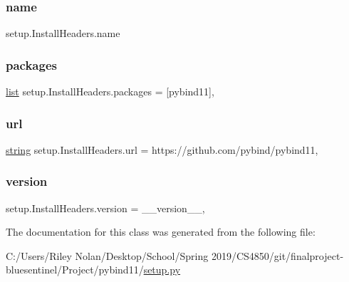 \subsubsection{\texorpdfstring{name}{name}}
{\footnotesize\ttfamily setup.\+Install\+Headers.\+name\hspace{0.3cm}{\ttfamily [static]}}

\mbox{\label{classsetup_1_1_install_headers_a4230d6d94fdf5948f36db48c501bd996}} 
\subsubsection{\texorpdfstring{packages}{packages}}
{\footnotesize\ttfamily \mbox{\hyperlink{classlist}{list}} setup.\+Install\+Headers.\+packages = \mbox{[}\textquotesingle{}pybind11\textquotesingle{}\mbox{]},\hspace{0.3cm}{\ttfamily [static]}}

\mbox{\label{classsetup_1_1_install_headers_a754ae3bec90ac6ced32d4ae4705a868c}} 
\subsubsection{\texorpdfstring{url}{url}}
{\footnotesize\ttfamily \mbox{\hyperlink{asdl_8h_ae84541b4f3d8e1ea24ec0f466a8c568b}{string}} setup.\+Install\+Headers.\+url = \textquotesingle{}https\+://github.\+com/pybind/pybind11\textquotesingle{},\hspace{0.3cm}{\ttfamily [static]}}

\mbox{\label{classsetup_1_1_install_headers_a413b3192ce921d5bfc74a1238faf65e6}} 
\subsubsection{\texorpdfstring{version}{version}}
{\footnotesize\ttfamily setup.\+Install\+Headers.\+version = \+\_\+\+\_\+version\+\_\+\+\_\+,\hspace{0.3cm}{\ttfamily [static]}}



The documentation for this class was generated from the following file\+:\begin{DoxyCompactItemize}
\item 
C\+:/\+Users/\+Riley Nolan/\+Desktop/\+School/\+Spring 2019/\+C\+S4850/git/finalproject-\/bluesentinel/\+Project/pybind11/\mbox{\hyperlink{setup_8py}{setup.\+py}}\end{DoxyCompactItemize}
